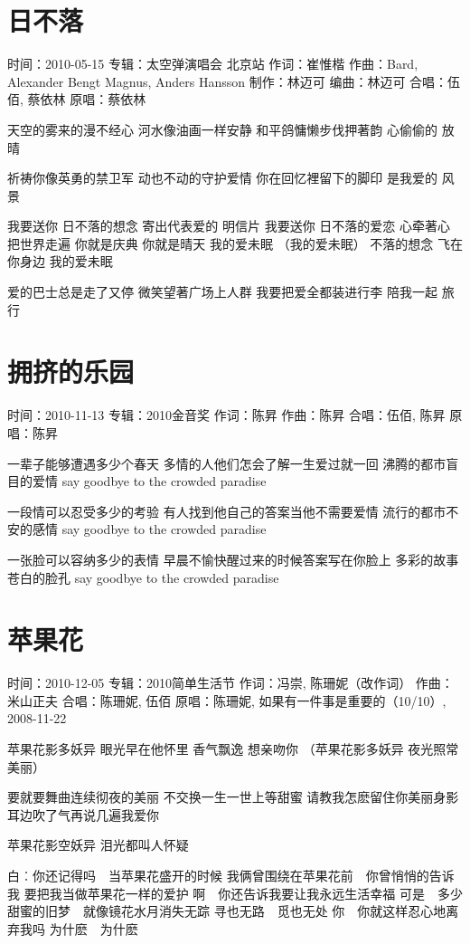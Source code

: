 \documentclass[UTF8,a4paper,oneside,twocolumn,12pt]{ctexbook}
\newcommand{\infopair}[2]{\textbullet #1：#2}
\newcommand{\zc}[1][伍佰]{\infopair{作词}{#1}}
\newcommand{\zq}[1][伍佰]{\infopair{作曲}{#1}}
\newcommand{\bq}[1][伍佰]{\infopair{编曲}{#1}}
\newcommand{\zj}[1]{\infopair{专辑}{#1}}
\newcommand{\zz}[1]{\infopair{制作}{#1}}
\newcommand{\yc}[1]{\infopair{原唱}{#1}}
\newcommand{\sj}[1]{\infopair{时间}{#1}}
\newenvironment{info}{\begin{flushleft}\kaishu
	}
	{\end{flushleft}\normalsize\yahei\par}
\newenvironment{lyric}{
	}
{}
\begin{document}
\section{日不落}
\begin{info}
	\sj{2010-05-15}
	\zj{太空弹演唱会 北京站}
	\zc[崔惟楷]
	\zq[Bard, Alexander Bengt Magnus, Anders Hansson]
	\zz{林迈可}
	\bq[林迈可]
	\infopair{合唱}{伍佰, 蔡依林}
	\yc{蔡依林}
\end{info}
\begin{lyric}
	天空的雾来的漫不经心
	河水像油画一样安静
	和平鸽慵懒步伐押著韵
	心偷偷的 放晴

	祈祷你像英勇的禁卫军
	动也不动的守护爱情
	你在回忆裡留下的脚印
	是我爱的 风景

	我要送你 日不落的想念
	寄出代表爱的 明信片
	我要送你 日不落的爱恋
	心牵著心 把世界走遍
	你就是庆典 你就是晴天 我的爱未眠 （我的爱未眠）
	不落的想念 飞在你身边 我的爱未眠

	爱的巴士总是走了又停
	微笑望著广场上人群
	我要把爱全都装进行李
	陪我一起 旅行
\end{lyric}

\section{拥挤的乐园}%
\begin{info}
	\sj{2010-11-13}
	\zj{2010金音奖}
	\zc[陈昇]
	\zq[陈昇]
	\infopair{合唱}{伍佰, 陈昇}
	\yc{陈昇}
\end{info}
\begin{lyric}
	一辈子能够遭遇多少个春天
	多情的人他们怎会了解一生爱过就一回
	沸腾的都市盲目的爱情
	say goodbye to the crowded paradise

	一段情可以忍受多少的考验
	有人找到他自己的答案当他不需要爱情
	流行的都市不安的感情
	say goodbye to the crowded paradise

	一张脸可以容纳多少的表情
	早晨不愉快醒过来的时候答案写在你脸上
	多彩的故事苍白的脸孔
	say goodbye to the crowded paradise
\end{lyric}

\section{苹果花}
\begin{info}
	\sj{2010-12-05}
	\zj{2010简单生活节}
	\zc[冯崇, 陈珊妮（改作词）]
	\zq[米山正夫]
	\infopair{合唱}{陈珊妮, 伍佰}
	\yc{陈珊妮, 如果有一件事是重要的（10/10）, 2008-11-22}
\end{info}
\begin{lyric}
	苹果花影多妖异 眼光早在他怀里
	香气飘逸 想亲吻你
	（苹果花影多妖异 夜光照常美丽）

	要就要舞曲连续彻夜的美丽
	不交换一生一世上等甜蜜
	请教我怎麽留住你美丽身影
	耳边吹了气再说几遍我爱你

	苹果花影空妖异 泪光都叫人怀疑

	白︰你还记得吗　当苹果花盛开的时候
	我俩曾围绕在苹果花前　你曾悄悄的告诉我
	要把我当做苹果花一样的爱护
	啊　你还告诉我要让我永远生活幸福
	可是　多少甜蜜的旧梦　就像镜花水月消失无踪
	寻也无路　觅也无处
	你　你就这样忍心地离弃我吗
	为什麽　为什麽
\end{lyric}
\end{document}
